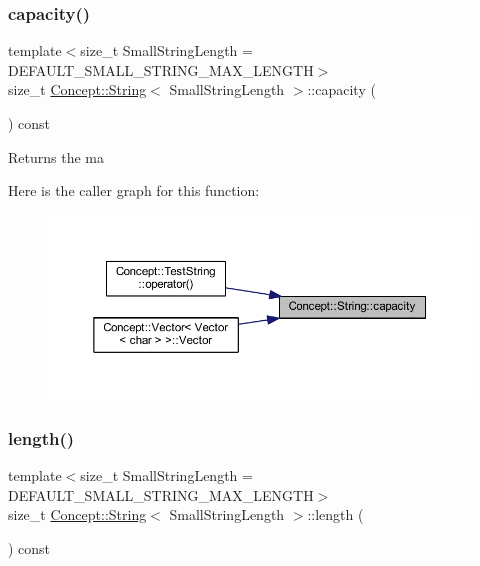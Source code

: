 \subsubsection{\texorpdfstring{capacity()}{capacity()}}
{\footnotesize\ttfamily template$<$size\+\_\+t Small\+String\+Length = D\+E\+F\+A\+U\+L\+T\+\_\+\+S\+M\+A\+L\+L\+\_\+\+S\+T\+R\+I\+N\+G\+\_\+\+M\+A\+X\+\_\+\+L\+E\+N\+G\+TH$>$ \\
size\+\_\+t \mbox{\hyperlink{class_concept_1_1_string}{Concept\+::\+String}}$<$ Small\+String\+Length $>$\+::capacity (\begin{DoxyParamCaption}{ }\end{DoxyParamCaption}) const\hspace{0.3cm}{\ttfamily [inline]}}

\begin{DoxyReturn}{Returns}
the ma 
\end{DoxyReturn}
Here is the caller graph for this function\+:\nopagebreak
\begin{figure}[H]
\begin{center}
\leavevmode
\includegraphics[width=350pt]{class_concept_1_1_string_a3224cd035b9e0d9f3bdaa4cff8fcbc0f_icgraph}
\end{center}
\end{figure}
\mbox{\label{class_concept_1_1_string_a21547a1e24398236bdf548eddeac437b}} 
\subsubsection{\texorpdfstring{length()}{length()}}
{\footnotesize\ttfamily template$<$size\+\_\+t Small\+String\+Length = D\+E\+F\+A\+U\+L\+T\+\_\+\+S\+M\+A\+L\+L\+\_\+\+S\+T\+R\+I\+N\+G\+\_\+\+M\+A\+X\+\_\+\+L\+E\+N\+G\+TH$>$ \\
size\+\_\+t \mbox{\hyperlink{class_concept_1_1_string}{Concept\+::\+String}}$<$ Small\+String\+Length $>$\+::length (\begin{DoxyParamCaption}{ }\end{DoxyParamCaption}) const\hspace{0.3cm}{\ttfamily [inline]}}

